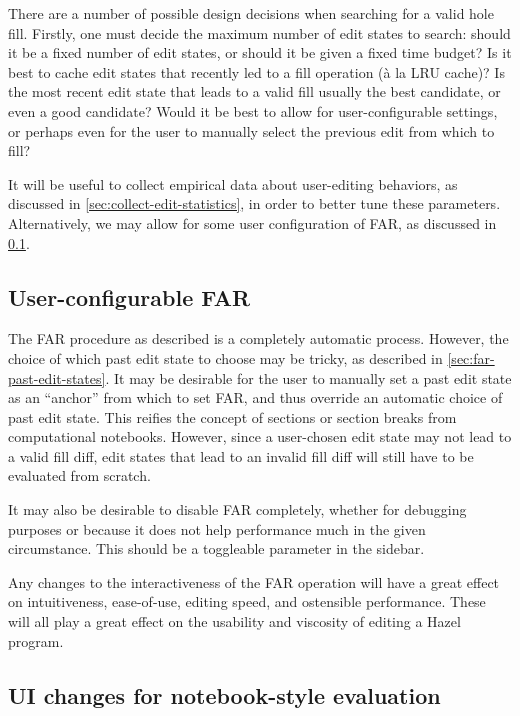 There are a number of possible design decisions when searching for a valid hole fill. Firstly, one must decide the maximum number of edit states to search: should it be a fixed number of edit states, or should it be given a fixed time budget? Is it best to cache edit states that recently led to a fill operation (\`a la LRU cache)? Is the most recent edit state that leads to a valid fill usually the best candidate, or even a good candidate? Would it be best to allow for user-configurable settings, or perhaps even for the user to manually select the previous edit from which to fill?

It will be useful to collect empirical data about user-editing behaviors, as discussed in \cref{sec:collect-edit-statistics}, in order to better tune these parameters. Alternatively, we may allow for some user configuration of FAR, as discussed in \cref{sec:far-improv-user-config}.

\subsection{User-configurable FAR}
\label{sec:far-improv-user-config}

The FAR procedure as described is a completely automatic process. However, the choice of which past edit state to choose may be tricky, as described in \cref{sec:far-past-edit-states}. It may be desirable for the user to manually set a past edit state as an ``anchor'' from which to set FAR, and thus override an automatic choice of past edit state. This reifies the concept of sections or section breaks from computational notebooks. However, since a user-chosen edit state may not lead to a valid fill diff, edit states that lead to an invalid fill diff will still have to be evaluated from scratch.

It may also be desirable to disable FAR completely, whether for debugging purposes or because it does not help performance much in the given circumstance. This should be a toggleable parameter in the sidebar.

Any changes to the interactiveness of the FAR operation will have a great effect on intuitiveness, ease-of-use, editing speed, and ostensible performance. These will all play a great effect on the usability and viscosity of editing a Hazel program.

\subsection{UI changes for notebook-style evaluation}
\label{sec:far-improv-notebook-ui}

